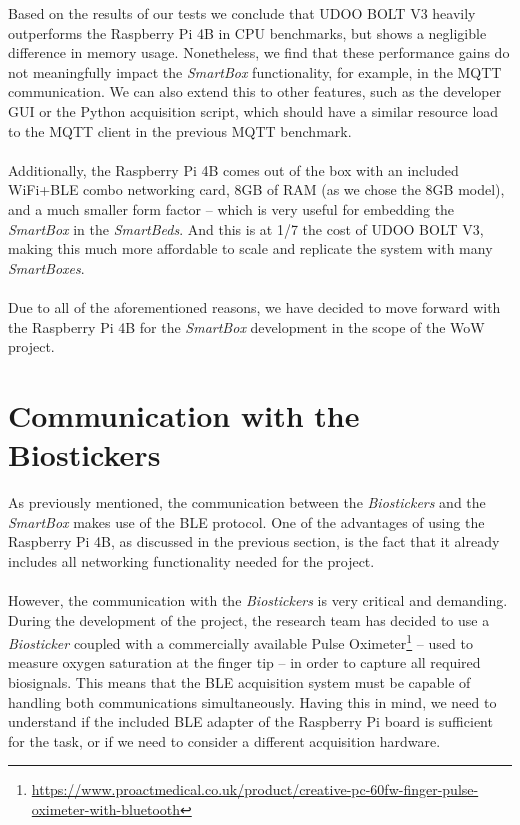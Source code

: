 Based on the results of our tests we conclude that UDOO BOLT V3 heavily outperforms the Raspberry Pi 4B in CPU benchmarks, but shows a negligible difference in memory usage. Nonetheless, we find that these performance gains do not meaningfully impact the \textit{SmartBox} functionality, for example, in the \acs{MQTT} communication. We can also extend this to other features, such as the developer \acs{GUI} or the Python acquisition script, which should have a similar resource load to the \acs{MQTT} client in the previous \acs{MQTT} benchmark.

\paragraph{} Additionally, the Raspberry Pi 4B comes out of the box with an included WiFi+\acs{BLE} combo networking card, 8GB of RAM (as we chose the 8GB model), and a much smaller form factor -- which is very useful for embedding the \textit{SmartBox} in the \textit{SmartBeds}. And this is at 1/7 the cost of UDOO BOLT V3, making this much more affordable to scale and replicate the system with many \textit{SmartBoxes}.

\paragraph{} Due to all of the aforementioned reasons, we have decided to move forward with the Raspberry Pi 4B for the \textit{SmartBox} development in the scope of the \acs{WoW} project.

\section{Communication with the Biostickers}

As previously mentioned, the communication between the \textit{Biostickers} and the \textit{SmartBox} makes use of the \acs{BLE} protocol. One of the advantages of using the Raspberry Pi 4B, as discussed in the previous section, is the fact that it already includes all networking functionality needed for the project. 


\paragraph{} However, the communication with the \textit{Biostickers} is very critical and demanding. During the development of the project, the research team has decided to use a \textit{Biosticker} coupled with a commercially available Pulse Oximeter\footnote{\url{https://www.proactmedical.co.uk/product/creative-pc-60fw-finger-pulse-oximeter-with-bluetooth}} -- used to measure oxygen saturation at the finger tip --  in order to capture all required biosignals. This means that the \acs{BLE} acquisition system must be capable of handling both communications simultaneously. Having this in mind, we need to understand if the included \acs{BLE} adapter of the Raspberry Pi board is sufficient for the task, or if we need to consider a different acquisition hardware.

